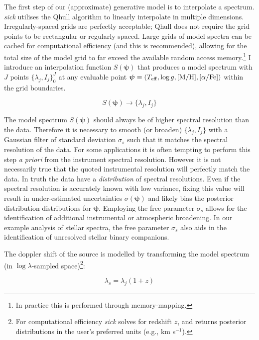\documentclass{aastex}
\newcommand{\sick}{\textit{sick}}
\begin{document}
The first step of our (approximate) generative model is to interpolate a spectrum. \sick{} utilises the Qhull algorithm \citep{qhull} to linearly interpolate in multiple dimensions. Irregularly-spaced grids are perfectly acceptable; Qhull does not require the grid points to be rectangular or regularly spaced. Large grids of model spectra can be cached for computational efficiency (and this is recommended), allowing for the total size of the model grid to far exceed the available random access memory.\footnote{In practice this is performed through memory-mapping.} I introduce an interpolation function $S(\bm{\psi})$ that produces a model spectrum with $J$ points $\{\lambda_j,I_j\}_{0}^{J}$ at any evaluable point $\bm{\psi} \equiv (T_{\rm eff},\log{g},{\rm [M/H]},[\alpha/{\rm Fe}])$ within the grid boundaries.

\begin{equation}
S(\bm{\psi}) \rightarrow \{\lambda_j,I_j\}
\end{equation}

The model spectrum $S(\bm{\psi})$ should always be of higher spectral resolution than the data. Therefore it is necessary to smooth (or broaden) $\{\lambda_j,I_j\}$ with a Gaussian filter of standard deviation $\sigma_{s}$ such that it matches the spectral resolution of the data. For some applications it is often tempting to perform this step \textit{a priori} from the instrument spectral resolution. However it is not necessarily true that the quoted instrumental resolution will perfectly match the data. In truth the data have a \textit{distribution} of spectral resolutions. Even if the spectral resolution is accurately known with low variance, fixing this value will result in under-estimated uncertainties $\sigma(\bm{\psi})$ and likely bias the posterior distribution distributions for $\bm{\psi}$. Employing the free parameter $\sigma_{s}$ allows for the identification of additional instrumental or atmospheric broadening. In our example analysis of stellar spectra, the free parameter $\sigma_{s}$ also aids in the identification of unresolved stellar binary companions.

The doppler shift of the source is modelled by transforming the model spectrum (in $\log\lambda$-sampled space)\footnote{For computational efficiency \sick{} solves for redshift $z$, and returns posterior distributions in the user's preferred units (e.g., km s$^{-1}$).}:

\begin{equation}
\lambda_{s} = \lambda_{j}(1 + z)
\end{equation}
\end{document}
